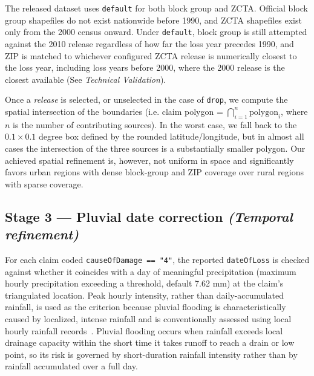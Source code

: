The released dataset uses \texttt{default} for both
block group and ZCTA.
%
Official block group shapefiles do not exist nationwide before 1990, and ZCTA shapefiles exist only from the 2000 census onward.
%
Under \texttt{default}, block group is still attempted against the
2010 release regardless of how far the loss year precedes 1990, and
ZIP is matched to whichever configured ZCTA release is numerically
closest to the loss year, including loss years before 2000, where the
2000 release is the closest available (See \emph{Technical Validation}).

Once a \emph{release} is selected, or unselected in the case of \texttt{drop}, we compute the spatial intersection of the boundaries (i.e. claim polygon = $\bigcap_{i=1}^{n} \text{polygon}_i$, where $n$ is the number of contributing sources).
%
In the worst case, we fall back to the $0.1 \times 0.1$ degree box defined by the rounded latitude/longitude, but in almost all cases the intersection of the three sources is a substantially smaller polygon.
%
Our achieved spatial refinement is, however, not uniform in space and significantly favors urban regions with dense block-group and ZIP coverage over rural regions with sparse coverage.

\subsection*{Stage 3 --- Pluvial date correction \emph{(Temporal refinement)}}

For each claim coded \texttt{causeOfDamage == "4"}, the reported
\texttt{dateOfLoss} is checked against whether it coincides with a day
of meaningful precipitation (maximum hourly precipitation exceeding a
threshold, default 7.62 mm) at the claim's triangulated location.
Peak hourly intensity, rather than daily-accumulated rainfall, is used
as the criterion because pluvial flooding is characteristically caused
by localized, intense rainfall and is conventionally assessed using
local hourly rainfall records~\cite{guerreiro_pluvial_2017}. Pluvial
flooding occurs when rainfall exceeds local drainage capacity within
the short time it takes runoff to reach a drain or low point, so its
risk is governed by short-duration rainfall intensity rather than by
rainfall accumulated over a full day.

